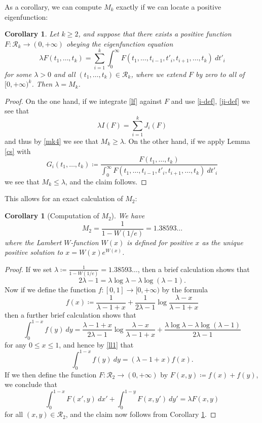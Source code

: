 \documentclass{bmcart}
\theoremstyle{plain}
\newtheorem{corollary}[theorem]{Corollary}
\theoremstyle{definition}
\begin{document}
As a corollary, we can compute $M_k$ exactly if we can locate a positive eigenfunction:

\begin{corollary}\label{ef}  Let $k \geq 2$, and suppose that there exists a positive function $F: {\mathcal R}_k \to (0,+\infty)$ obeying the eigenfunction equation
\begin{equation}\label{lf}
 \lambda F(t_1,\dots,t_k) = \sum_{i=1}^k \int_0^\infty F(t_1,\dots,t_{i-1},t'_i, t_{i+1},\dots,t_k)\ dt'_i
\end{equation}
for some $\lambda > 0$ and all $(t_1,\dots,t_k) \in {\mathcal R}_k$, where we extend $F$ by zero to all of $[0,+\infty)^k$.  Then $\lambda = M_k$.
\end{corollary}

\begin{proof}  On the one hand, if we integrate \eqref{lf} against $F$ and use \eqref{i-def}, \eqref{ji-def} we see that
$$ \lambda I(F) = \sum_{i=1}^k J_i(F)$$
and thus by \eqref{mk4} we see that $M_k \geq \lambda$.  On the other hand, if we apply Lemma \ref{cs} with
$$ G_i(t_1,\dots,t_k) \coloneqq \frac{F(t_1,\dots,t_k)}{\int_0^\infty F(t_1,\dots,t_{i-1},t'_i, t_{i+1},\dots,t_k)\ dt'_i}$$
we see that $M_k \leq \lambda$, and the claim follows.
\end{proof}

This allows for an exact calculation of $M_2$:

\begin{corollary}[Computation of $M_2$]\label{m2-comp}
We have 
$$M_2 = \frac{1}{1 - W(1/e)} = 1.38593\dots$$
where the Lambert $W$-function $W(x)$ is defined for positive $x$ as the unique positive solution to $x = W(x) e^{W(x)}$.
\end{corollary}

\begin{proof}  If we set $\lambda \coloneqq \frac{1}{1-W(1/e)} = 1.38593\dots$, then a brief calculation shows that
\begin{equation}\label{ll1}
 2\lambda - 1 = \lambda \log \lambda - \lambda \log(\lambda-1).
\end{equation}
Now if we define the function $f: [0,1] \to [0,+\infty)$ by the formula
$$ f(x) \coloneqq \frac{1}{\lambda-1+x} + \frac{1}{2\lambda-1} \log \frac{\lambda-x}{\lambda-1+x}$$
then a further brief calculation shows that
$$ \int_0^{1-x} f(y)\ dy = \frac{\lambda-1+x}{2\lambda-1} \log \frac{\lambda-x}{\lambda-1+x} + \frac{\lambda \log \lambda - \lambda \log(\lambda-1)}{2\lambda-1}$$
for any $0 \leq x \leq 1$, and hence by \eqref{ll1} that
$$ \int_0^{1-x} f(y)\ dy = (\lambda-1+x) f(x).$$
If we then define the function $F: {\mathcal R}_2 \to (0,+\infty)$ by $F(x,y) \coloneqq f(x) + f(y)$, we conclude that
$$ \int_0^{1-x} F(x',y)\ dx' + \int_0^{1-y} F(x,y')\ dy' = \lambda F(x,y)$$
for all $(x,y) \in {\mathcal R}_2$, and the claim now follows from Corollary \ref{ef}.
\end{proof}
\end{document}
